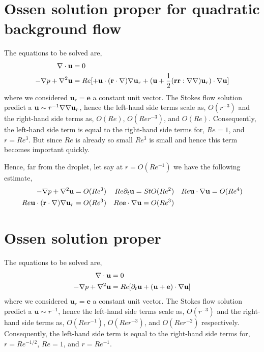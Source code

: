 \section{Ossen solution proper for quadratic background flow}

The equations to be solved are, 
\begin{align}
    \mathbf{\nabla}\cdot \textbf{u} &= 0
    \\
    -\mathbf{\nabla} p + \mathbf{\nabla}^2 \textbf{u}
    &= 
    Re [
        + \textbf{u}\cdot (\textbf{r}\cdot \mathbf{\nabla})\mathbf{\nabla} \textbf{u}_r
        + (\textbf{u} + \frac{1}{2}(\textbf{rr}:\mathbf{\nabla}\mathbf{\nabla})\textbf{u}_r) \cdot \mathbf{\nabla} \textbf{u}
        ]
\end{align}
where we considered $\textbf{u}_r = \textbf{e}$ a constant unit vector. 
The Stokes flow solution predict a $\textbf{u}\sim r^{-1}\mathbf{\nabla}\mathbf{\nabla} \textbf{u}_r$, hence the left-hand side terms scale as, $O(r^{-3})$ and the right-hand side terms as, $O(Re)$, $O(Re r^{-3})$, and $O(Re)$. 
Consequently, the left-hand side term is equal to the right-hand side terms for, $Re = 1$, and $r = Re^3$. 
But since $Re$ is already so small $Re^3$ is small and hence this term becomes important quickly. 

Hence, far from the droplet, let say at $r = O(Re^{-1})$ we have the following estimate, 
\begin{align}
    -\mathbf{\nabla} p + \mathbf{\nabla}^2 \textbf{u} = O(Re^3) &&
    Re \partial_t \textbf{u} = St O(Re^2) && 
    Re \textbf{u}\cdot \mathbf{\nabla} \textbf{u} = O(Re^4) \\
    Re \textbf{u}\cdot (\textbf{r}\cdot \mathbf{\nabla})\mathbf{\nabla} \textbf{u}_r = O(Re^3) 
    &&
    Re \textbf{e}\cdot \mathbf{\nabla} \textbf{u} = O(Re^3) 
    &&
\end{align}



\section{Ossen solution proper}

The equations to be solved are, 
\begin{align}
    \mathbf{\nabla}\cdot \textbf{u} &= 0
    \\
    -\mathbf{\nabla} p + \mathbf{\nabla}^2 \textbf{u}
    &= 
    Re [
    \partial_t \textbf{u}
    + (\textbf{u}+ \textbf{e})\cdot \mathbf{\nabla} \textbf{u}]
\end{align}
where we considered $\textbf{u}_r = \textbf{e}$ a constant unit vector. 
The Stokes flow solution predict a $\textbf{u}\sim r^{-1}$, hence the left-hand side terms scale as, $O(r^{-3})$ and the right-hand side terms as, $O(Re r^{-1})$, $O(Re r^{-3})$, and $O(Re r^{-2})$ respectively. 
Consequently, the left-hand side term is equal to the right-hand side terms for, $r =Re^{-1/2}$, $Re = 1$, and $r = Re^{-1}$. 

